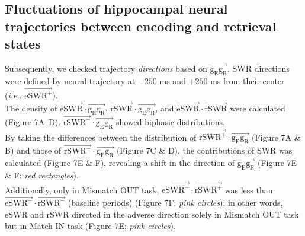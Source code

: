 \documentclass[final,3p,times,twocolumn]{elsarticle}
\begin{document}
\subsection{Fluctuations of hippocampal neural trajectories between encoding and retrieval states}
Subsequently, we checked trajectory \textit{directions} based on $\overrightarrow{\mathrm{g_{E}g_{R}}}$. SWR directions were defined by neural trajectory at $-250$ ms and $+250$ ms from their center (\textit{i.e.}, $\overrightarrow{\mathrm{eSWR^+}}$).
\\
\indent
The density of $\overrightarrow{\mathrm{eSWR}} \cdot \overrightarrow{\mathrm{g_{E}g_{R}}}$, $\overrightarrow{\mathrm{rSWR}} \cdot \overrightarrow{\mathrm{g_{E}g_{R}}}$, and $\overrightarrow{\mathrm{eSWR}} \cdot \overrightarrow{\mathrm{rSWR}}$ were calculated (Figure 7A--D). $\overrightarrow{\mathrm{rSWR^-}} \cdot \overrightarrow{\mathrm{g_{E}g_{R}}}$ showed biphasic distributions.
\\
\indent
By taking the differences between the distribution of $\overrightarrow{\mathrm{rSWR^+}} \cdot \overrightarrow{\mathrm{g_{E}g_{R}}}$ (Figure 7A \& B) and those of $\overrightarrow{\mathrm{rSWR^-}} \cdot \overrightarrow{\mathrm{g_{E}g_{R}}}$ (Figure 7C \& D), the contributions of SWR was calculated (Figure 7E \& F), revealing a shift in the direction of $\overrightarrow{\mathrm{g_{E}g_{R}}}$ (Figure 7E \& F; \textit{red rectangles}).
\\
\indent
Additionally, only in Mismatch OUT task, $\overrightarrow{\mathrm{eSWR^+}} \cdot \overrightarrow{\mathrm{rSWR^+}}$ was less than $\overrightarrow{\mathrm{eSWR^-}} \cdot \overrightarrow{\mathrm{rSWR^-}}$ (baseline periods) (Figure 7F; \textit{pink circles}); in other words, eSWR and rSWR directed in the adverse direction solely in Mismatch OUT task but in Match IN task (Figure 7E; \textit{pink circles}).
\label{sec:results}
\end{document}
